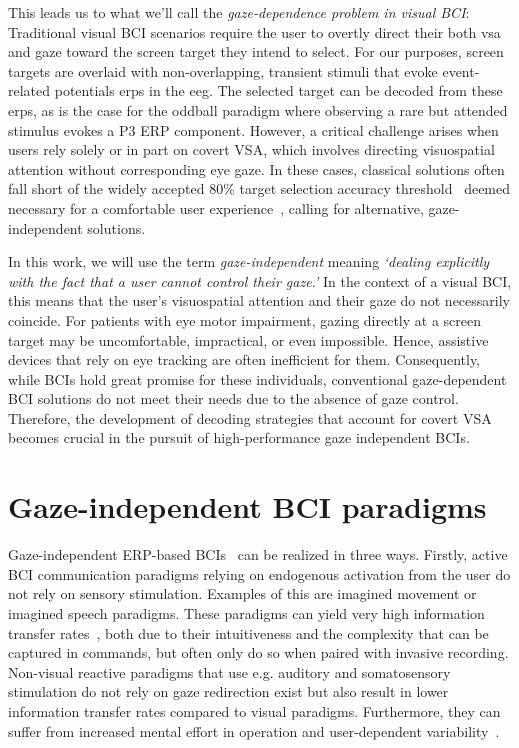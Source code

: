 This leads us to what we'll call the \emph{gaze-dependence problem in visual
BCI}:
Traditional visual BCI scenarios require the user to overtly direct their both
\ac{vsa} and gaze toward the screen target they intend to select.
For our purposes, screen targets are overlaid with non-overlapping, transient
stimuli that evoke event-related  potentials \acp{erp} in the \ac{eeg}.
The selected target can be decoded from these \acp{erp}, as is the case for the
oddball paradigm where observing a rare but attended stimulus evokes a P3 ERP
component.
However, a critical challenge arises when users rely solely or in part on covert
VSA, which involves directing visuospatial attention without corresponding eye gaze.
In these cases, classical solutions often fall short of the widely accepted
80\% target selection accuracy threshold~\cite{Brunner2010,Frenzel2011,Treder2010,Ron2019} deemed necessary for a comfortable user
experience~\cite{Neeling2019}, calling for alternative, gaze-independent
solutions.

In this work, we will use the term \emph{gaze-independent} meaning
\emph{‘dealing explicitly with the fact that a user cannot control their
gaze.'}
In the context of a visual BCI, this means that the user's
visuospatial attention and their gaze do not necessarily coincide.
For patients with eye motor impairment, gazing directly at a screen target may
be uncomfortable, impractical, or even impossible.
Hence, assistive devices that rely on eye tracking are often inefficient for
them.
Consequently, while BCIs hold great promise for these individuals, conventional
gaze-dependent BCI solutions do not meet their needs due to the absence of gaze
control. Therefore, the development of decoding strategies that account for covert
VSA becomes crucial in the pursuit of high-performance gaze independent
BCIs.



\section{Gaze-independent BCI paradigms}
\label{sec:gaze-independence}

Gaze-independent ERP-based BCIs~\cite{Riccio2012, Aloise2012} can be realized in three
ways.
Firstly, active BCI communication paradigms relying on endogenous activation from the user
do not rely on sensory stimulation.
Examples of this are imagined movement or imagined speech paradigms.
These paradigms can yield very high information transfer
rates~\cite{Willett2021,Metzger2023}, both due to their intuitiveness and the
complexity that can be captured in commands, but often only do so when paired
with invasive recording.
Non-visual reactive paradigms that use e.g. auditory and somatosensory
stimulation do not rely on gaze redirection exist but also result in lower information transfer
rates compared to visual paradigms.
Furthermore, they can suffer from increased mental effort in operation and user-dependent variability~\cite{Reichert2020b}.

